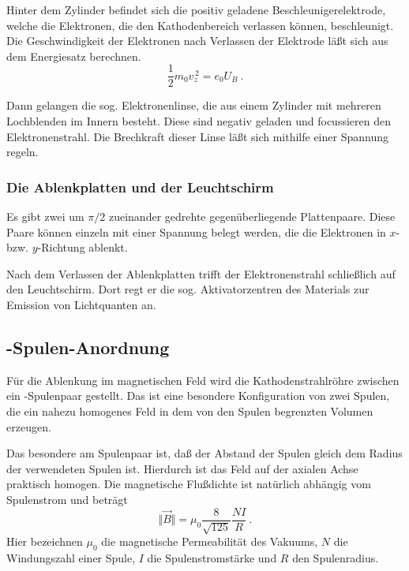 Hinter dem Zylinder befindet sich die positiv geladene
Beschleunigerelektrode, welche die Elektronen, die den Kathodenbereich
verlassen können, beschleunigt. Die Geschwindigkeit der Elektronen nach
Verlassen der Elektrode läßt sich aus dem Energiesatz berechnen.
%
\begin{equation}
  \label{eq:acc-volt-vel-z}
  \frac{1}{2} m_0 v_z^{\,2} = e_0 U_B \:.
\end{equation}

Dann gelangen die sog. Elektronenlinse, die aus einem Zylinder mit
mehreren Lochblenden im Innern besteht. Diese sind negativ geladen und
focussieren den Elektronenstrahl. Die Brechkraft dieser Linse läßt sich
mithilfe einer Spannung regeln.

\subsubsection{Die Ablenkplatten und der Leuchtschirm}

Es gibt zwei um $\pi/2$ zueinander gedrehte gegenüberliegende
Plattenpaare. Diese Paare können einzeln mit einer Spannung belegt
werden, die die Elektronen in $x$- bzw. $y$-Richtung ablenkt.

Nach dem Verlassen der Ablenkplatten trifft der Elektronenstrahl
schließlich auf den Leuchtschirm. Dort regt er die sog. Aktivatorzentren
des Materials zur Emission von Lichtquanten an.

\subsection{-Spulen-Anordnung}

Für die Ablenkung im magnetischen Feld wird die Kathodenstrahlröhre
zwischen ein -Spulenpaar gestellt. Das ist eine
besondere Konfiguration von zwei Spulen, die ein nahezu homogenes Feld
in dem von den Spulen begrenzten Volumen erzeugen.

Das besondere am Spulenpaar ist, daß der Abstand der Spulen gleich dem
Radius der verwendeten Spulen ist. Hierdurch ist das Feld auf der
axialen Achse praktisch homogen. Die magnetische Flußdichte ist
natürlich abhängig vom Spulenstrom und beträgt
%
\begin{equation}
  \label{eq:mag-force-helmholtz}
  \Vert\vec{B}\Vert = \mu_0 \frac{8}{\sqrt{125}} \frac{NI}{R} \:.
\end{equation}
%
Hier bezeichnen $\mu_0$ die magnetische Permeabilität des Vakuums, $N$
die Windungszahl einer Spule, $I$ die Spulenstromstärke und $R$ den
Spulenradius.

